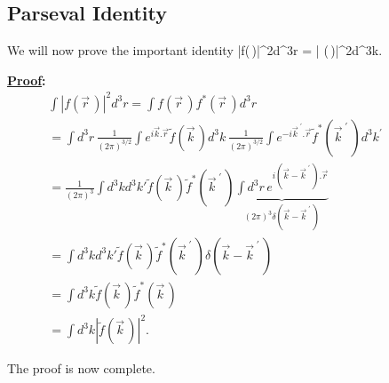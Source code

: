\newpage

\subsection{Parseval Identity}
We will now prove the important identity
\be
\int \left|f(\,)\right|^2d^3r = \int \left| (\,)\right|^2d^3k.
\ee

\vspace{5 mm}
{\bf \underline{Proof}:}
\begin{multline}
\int \left|f(\vec{r}\,)\right|^2d^3r = \int f(\vec{r}\,) f^*(\vec{r}\,)d^3r \\
=\int d^3r \, \frac{1}{(2\pi)^{3/2}} \int e^{i\vec{k}.\vec{r}} \tilde{f}(\vec{k}\,)d^3k \,
\frac{1}{(2\pi)^{3/2}}   \int e^{-i\vec{k}^{\; \prime}.\vec{r}} \tilde{f}^*(\vec{k}^{\; \prime}\,)d^3k^{\prime}~~~~\\
=\frac{1}{(2\pi)^3}\int d^3k d^3k' \tilde{f}(\vec{k}\,) \tilde{f}^*(\vec{k}^{\; \prime}\,)
\underbrace{ \int d^3r\, e^{i(\vec{k}-\vec{k}^{\; \prime}\,).\vec{r}} }_{(2\pi)^3 \delta(\vec{k}-\vec{k}^{\; \prime}\,) }
\qquad \qquad \qquad ~~~\\
= \int d^3k d^3k' \tilde{f}(\vec{k}\,) \tilde{f}^*(\vec{k}^{\; \prime}\,)\delta(\vec{k}-\vec{k}^{\; \prime}\,) \qquad
\qquad \qquad \qquad \qquad ~~~~~~\\
= \int d^3k  \tilde{f}(\vec{k}\,) \tilde{f}^*(\vec{k}\,) \qquad \qquad \qquad \qquad \qquad\qquad\qquad\qquad
~~~~~ \\
= \int d^3k \left | \tilde{f}(\vec{k}\,) \right|^2. \qquad \qquad \qquad \qquad \qquad \qquad \qquad \qquad \qquad ~~
\end{multline}

The proof is now complete.


					




